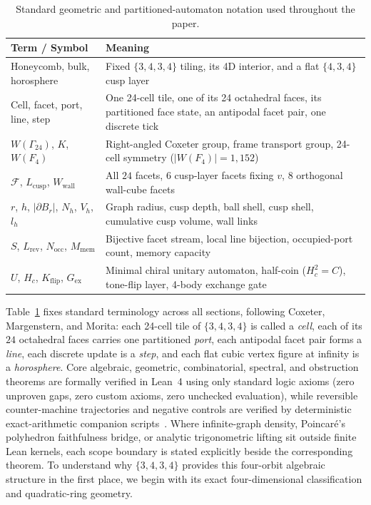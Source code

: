 \begin{table}[tb]
\centering
\caption{Standard geometric and partitioned-automaton notation used throughout the paper.}
\label{tab:notation}
\small
\begin{tabularx}{\textwidth}{@{}lX@{}}
\toprule
Term / Symbol & Meaning \\
\midrule
Honeycomb, bulk, horosphere & Fixed $\{3,4,3,4\}$ tiling, its 4D interior, and a flat $\{4,3,4\}$ cusp layer \\
Cell, facet, port, line, step & One 24-cell tile, one of its 24 octahedral faces, its partitioned face state, an antipodal facet pair, one discrete tick \\
$W(\Gamma_{24})$, $K$, $W(F_4)$ & Right-angled Coxeter group, frame transport group, 24-cell symmetry ($|W(F_4)|=1{,}152$) \\
$\mathcal{F}$, $L_{\mathrm{cusp}}$, $W_{\mathrm{wall}}$ & All $24$ facets, $6$ cusp-layer facets fixing $v$, $8$ orthogonal wall-cube facets \\
$r$, $h$, $|\partial B_r|$, $N_h$, $V_h$, $l_h$ & Graph radius, cusp depth, ball shell, cusp shell, cumulative cusp volume, wall links \\
$S$, $L_{\mathrm{rev}}$, $N_{\mathrm{occ}}$, $M_{\mathrm{mem}}$ & Bijective facet stream, local line bijection, occupied-port count, memory capacity \\
$U$, $H_c$, $K_{\mathrm{flip}}$, $G_{\mathrm{ex}}$ & Minimal chiral unitary automaton, half-coin ($H_c^2 = C$), tone-flip layer, 4-body exchange gate \\
\bottomrule
\end{tabularx}
\end{table}

Table~\ref{tab:notation} fixes standard terminology across all sections, following Coxeter, Margenstern, and Morita: each 24-cell tile of $\{3,4,3,4\}$ is called a \emph{cell}, each of its $24$ octahedral faces carries one partitioned \emph{port}, each antipodal facet pair forms a \emph{line}, each discrete update is a \emph{step}, and each flat cubic vertex figure at infinity is a \emph{horosphere}. Core algebraic, geometric, combinatorial, spectral, and obstruction theorems are formally verified in Lean~4 using only standard logic axioms (zero unproven gaps, zero custom axioms, zero unchecked evaluation), while reversible counter-machine trajectories and negative controls are verified by deterministic exact-arithmetic companion scripts~\cite{pollard2026repo}. Where infinite-graph density, Poincar\'e's polyhedron faithfulness bridge, or analytic trigonometric lifting sit outside finite Lean kernels, each scope boundary is stated explicitly beside the corresponding theorem. To understand why $\{3,4,3,4\}$ provides this four-orbit algebraic structure in the first place, we begin with its exact four-dimensional classification and quadratic-ring geometry.
